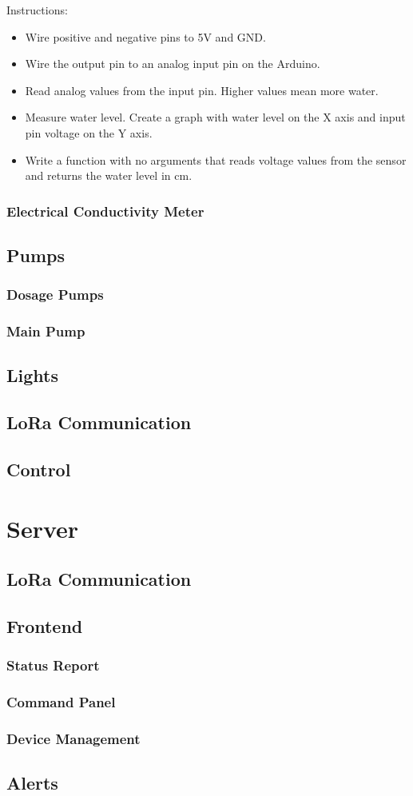 \documentclass[a4paper]{article}
\begin{document}
Instructions:
\begin{itemize}
 \item Wire positive and negative pins to 5V and GND.
 \item Wire the output pin to an analog input pin on the Arduino.
 \item Read analog values from the input pin. Higher values mean more water.
 \item Measure water level. Create a graph with water level on the X axis and input pin voltage on the Y axis.
 \item Write a function with no arguments that reads voltage values from the sensor and returns the water level in cm.
\end{itemize}


\subsubsection{Electrical Conductivity Meter}
\subsection{Pumps}
\subsubsection{Dosage Pumps}
\subsubsection{Main Pump}
\subsection{Lights}
\subsection{LoRa Communication}
\subsection{Control}
\section{Server}
\subsection{LoRa Communication}
\subsection{Frontend}
\subsubsection{Status Report}
\subsubsection{Command Panel}
\subsubsection{Device Management}
\subsection{Alerts}
\end{document}
